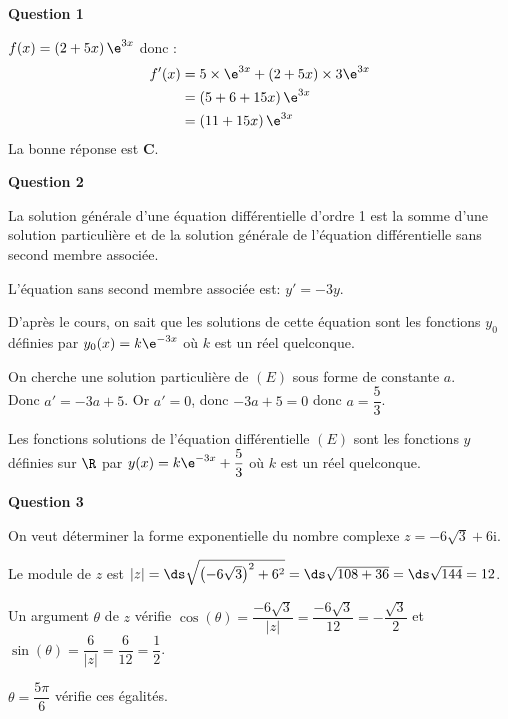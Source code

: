 \bigskip

\textbf{Question 1}

\medskip

$f(x)=\left (2+5x\right ) \e^{3x}$ donc :
\begin{align*}
f'(x) &= 5\times \e^{3x} + \left (2+5x\right )\times 3\e^{3x} \\
&= \left (5+6+15x\right ) \e^{3x} \\
&= \left (11+15x\right )\e^{3x}
\end{align*}
La bonne réponse est \textbf{C}.

\bigskip

\textbf{Question 2}

\medskip

La solution générale d'une équation différentielle d'ordre 1 est la somme d'une solution particulière et de la solution générale de l'équation différentielle sans second membre associée.

\begin{list}{\textbullet}{}
\item L'équation sans second membre associée est: $y'=-3y$.

D'après le cours, on sait que les solutions de cette équation sont les fonctions $y_0$ définies par $y_0(x)= k\e^{-3x}$ où $k$ est un réel quelconque.

\item On cherche une solution particulière de $(E)$ sous forme de constante $a$. \\
Donc $a'=-3a+5$. Or $a'=0$, donc $-3a+5=0$ donc $a=\dfrac{5}{3}$.
\end{list}

Les fonctions solutions de l'équation différentielle $(E)$ sont les fonctions $y$ définies sur $\R$ par $y(x)= k \e^{-3x} +\dfrac{5}{3}$ où $k$ est un réel quelconque.

\bigskip

\textbf{Question 3}

\medskip

On veut déterminer la forme exponentielle du nombre complexe 
$z = - 6\sqrt 3 + 6\text{i}.$

\begin{list}{\textbullet}{}
\item Le module de $z$ est $|z| = \ds\sqrt{\left(-6\sqrt{3}\right )^2 + 6^2 } = \ds\sqrt{108+36} = \ds\sqrt{144}=12$.

\item Un argument $\theta$ de $z$ vérifie $\cos\left (\theta\right )=\dfrac{-6\sqrt{3}}{|z|} = \dfrac{-6\sqrt{3}}{12} = -\dfrac{\sqrt{3}}{2}$ et $\sin\left (\theta\right )=\dfrac{6}{|z|} = \dfrac{6}{12} = \dfrac{1}{2}$.

$\theta = \dfrac{5\pi}{6}$ vérifie ces égalités.
\end{list}

